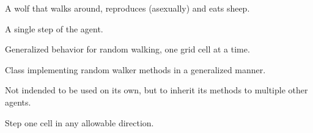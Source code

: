 \documentclass[letterpaper,10pt,english]{sphinxmanual}
\begin{document}
\begin{fulllineitems}
\label{\detokenize{index:examples.wolf_sheep.wolf_sheep.agents.Wolf}}
A wolf that walks around, reproduces (asexually) and eats sheep.

\begin{fulllineitems}
\label{\detokenize{index:examples.wolf_sheep.wolf_sheep.agents.Wolf.step}}
A single step of the agent.

\end{fulllineitems}


\end{fulllineitems}

\label{\detokenize{index:module-examples.wolf_sheep.wolf_sheep.random_walk}}
Generalized behavior for random walking, one grid cell at a time.

\begin{fulllineitems}
\label{\detokenize{index:examples.wolf_sheep.wolf_sheep.random_walk.RandomWalker}}
Class implementing random walker methods in a generalized manner.

Not indended to be used on its own, but to inherit its methods to multiple
other agents.

\begin{fulllineitems}
\label{\detokenize{index:examples.wolf_sheep.wolf_sheep.random_walk.RandomWalker.random_move}}
Step one cell in any allowable direction.

\end{fulllineitems}


\end{fulllineitems}
\end{document}
